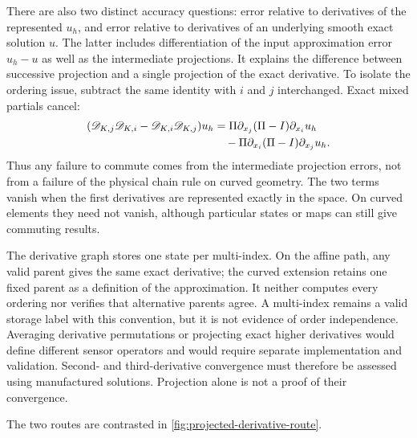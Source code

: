 There are also two distinct accuracy questions: error relative to derivatives
of the represented $u_h$, and error relative to derivatives of an underlying
smooth exact solution $u$. The latter includes differentiation of the input
approximation error $u_h-u$ as well as the intermediate projections.
It explains the difference between successive projection and a single
projection of the exact derivative. To isolate the ordering issue, subtract
the same identity with $i$ and $j$ interchanged. Exact mixed partials cancel:
\begin{align}
 (\mathscr D_{K,j}\mathscr D_{K,i}
   -\mathscr D_{K,i}\mathscr D_{K,j})u_h
 &=\Pi\partial_{x_j}(\Pi-I)\partial_{x_i}u_h\notag\\
 &\quad-\Pi\partial_{x_i}(\Pi-I)\partial_{x_j}u_h.
 \label{eq:curved-commutator}
\end{align}
Thus any failure to commute comes from the intermediate projection errors,
not from a failure of the physical chain rule on curved geometry. The two
terms vanish when the first derivatives are represented exactly in the
space. On curved elements they need not vanish, although particular states
or maps can still give commuting results.

The derivative graph stores one state per multi-index. On the affine path,
any valid parent gives the same exact derivative; the curved extension
retains one fixed parent as a definition of the approximation. It neither
computes every ordering nor verifies that alternative parents agree.
A multi-index remains a valid storage label with this convention, but it is
not evidence of order independence. Averaging derivative permutations or
projecting exact higher derivatives would define different sensor operators
and would require separate implementation and validation. Second- and
third-derivative convergence must therefore be assessed using
manufactured solutions. Projection alone is not a proof of their convergence.

The two routes are contrasted in \cref{fig:projected-derivative-route}.


